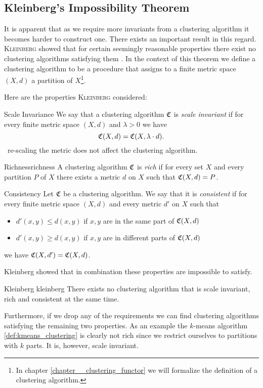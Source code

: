 \subsection{Kleinberg's Impossibility Theorem}
It is apparent that as we require more invariants from a clustering algorithm it becomes harder to construct one.
There exists an important result in this regard.
\textsc{Kleinberg} showed that for certain seemingly reasonable properties there exist no clustering algorithms satisfying them \cite{Kleinberg2002}.
In the context of this theorem we define a clustering algorithm to be a procedure that assigns to a finite metric space $(X,d)$ a partition of $X$\footnote{In chapter \ref{chapter__clustering_functor} we will formalize the definition of a clustering algorithm.}.

Here are the properties \textsc{Kleinberg} considered:

\begin{definition}{Scale Invariance}{}
We say that a clustering algorithm $\mathfrak{C}$ is \emph{scale invariant} if for every finite metric space $(X,d)$ and $\lambda > 0$ we have
$$
\mathfrak{C}(X,d) = \mathfrak{C}(X, \lambda \cdot d).
$$
\Ie\ re-scaling the metric does not affect the clustering algorithm.
\end{definition}

\begin{definition}{Richness}{richness}
A clustering algorithm $\mathfrak{C}$ is \emph{rich} if for every set $X$ and every partition $P$ of $X$ there exists a metric $d$ on $X$ such that $\mathfrak{C}(X,d) = P$.
\end{definition}

\begin{definition}{Consistency}{}
Let $\mathfrak{C}$ be a clustering algorithm. We say that it is \emph{consistent} if for every finite metric space $(X,d)$ and every metric $d'$ on $X$ such that
\begin{itemize}
    \item $d'(x,y) \leq d(x,y)$ if $x,y$ are in the same part of $\mathfrak{C}(X,d)$
    \item $d'(x,y) \geq d(x,y)$ if $x,y$ are in different parts of $\mathfrak{C}(X,d)$
\end{itemize}
we have $\mathfrak{C}(X,d') = \mathfrak{C}(X,d)$.
\end{definition}

Kleinberg showed that in combination these properties are impossible to satisfy.

\begin{theorem}{Kleinberg \cite[Thm.~2.1]{Kleinberg2002}}{kleinberg}
There exists no clustering algorithm that is scale invariant, rich and consistent at the same time.
\end{theorem}

Furthermore, if we drop any of the requirements we can find clustering algorithms satisfying the remaining two properties. As an example the $k$-means algorithm \ref{def:kmeans_clustering} is clearly not rich since we restrict ourselves to partitions with $k$ parts. It is, however, scale invariant.